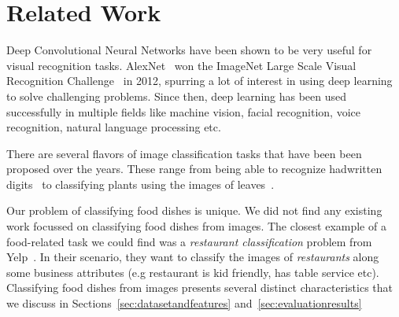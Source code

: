 \section{Related Work}
\label{sec:relatedwork}

%


Deep Convolutional Neural Networks have been shown to be very useful for visual recognition tasks. AlexNet~\cite{krizhevsky2012imagenet} won the ImageNet Large Scale Visual Recognition Challenge~\cite{russakovsky2015imagenet} in 2012, spurring a lot of interest in using deep learning to solve challenging problems. Since then, deep learning has been used successfully in multiple fields like machine vision, facial recognition, voice recognition, natural language processing etc.

There are several flavors of image classification tasks that have been been proposed over the years. These range from being able to recognize hadwritten digits~\cite{lecun1990handwritten} to classifying plants using the images of leaves~\cite{kaggleleaf}.   

Our problem of classifying food dishes is unique. We did not find any existing work focussed on classifying food dishes from images. The closest example of a food-related task we could find was a \textit{restaurant classification} problem from Yelp~\cite{kagglerestaurantyelp}. In their scenario, they want to classify the images of \textit{restaurants} along some business attributes (e.g restaurant is kid friendly, has table service  etc). Classifying food dishes from images presents several distinct characteristics that we discuss in Sections~\ref{sec:datasetandfeatures} and~\ref{sec:evaluationresults}






